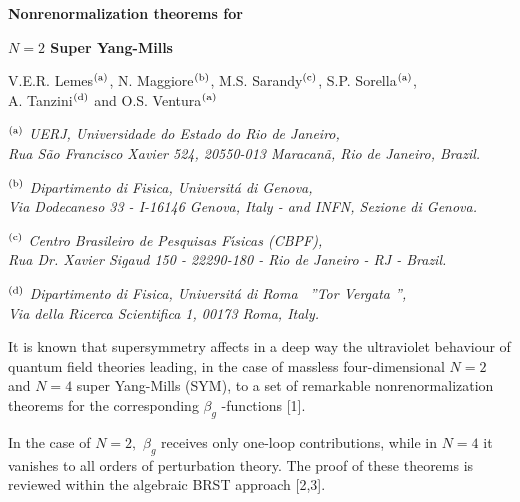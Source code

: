 \documentclass[a4paper,a4paper]{article}
\begin{document}
\begin{center}
{\LARGE {\bf Nonrenormalization theorems for  }}

\vspace{2mm}

{\LARGE {\bf $N=2$ Super Yang-Mills }}
 
\vspace{5mm} 

{\large V.E.R. Lemes$^{{\rm (a) }}$, N. Maggiore$^{{\rm (b) }}$, 
M.S. Sarandy$^{{\rm (c)}}$, S.P. Sorella$^{{\rm (a) }}$, \\ A. Tanzini$^{{\rm (d) }}$ and 
O.S. Ventura$^{{\rm (a) }}$}   
\vspace{5mm}

$^{{\rm (a)}}$ {\it UERJ, Universidade do Estado do Rio de Janeiro, \\
Rua S\~{a}o Francisco Xavier 524, 20550-013 Maracan\~{a}, Rio de Janeiro, Brazil.}

\vspace{3mm}

$^{{\rm (b)}}$ {\it Dipartimento di Fisica, Universit\'{a}
di Genova, \\ 
Via Dodecaneso 33 - I-16146 Genova, Italy - and INFN, Sezione di Genova.}

\vspace{3mm}

$^{{\rm (c)}}$ {\it Centro Brasileiro de Pesquisas F\'\i sicas (CBPF), 
\\Rua Dr. Xavier Sigaud 150 - 22290-180 - Rio de Janeiro - RJ - Brazil.}

\vspace{3mm} 

$^{{\rm (d)}}$ {\it Dipartimento di Fisica, Universit\'{a}
di Roma \ ''Tor Vergata '', 
\\Via della Ricerca Scientifica 1, 00173 Roma, Italy.}

\end{center}

\vspace{1cm}

It is known that supersymmetry affects in a deep way the
ultraviolet behaviour of quantum field theories leading, in the case of massless 
four-dimensional $N=2$ and $N=4$ super Yang-Mills (SYM), to a set of
remarkable nonrenormalization theorems for the corresponding $\beta _g$%
-functions [1]. 

In the case of $N=2,$ $\beta _g$ receives only one-loop contributions, while
in $N=4$ it vanishes to all orders of perturbation theory. The proof of these 
theorems is reviewed within the algebraic BRST approach [2,3]. 
\end{document}
